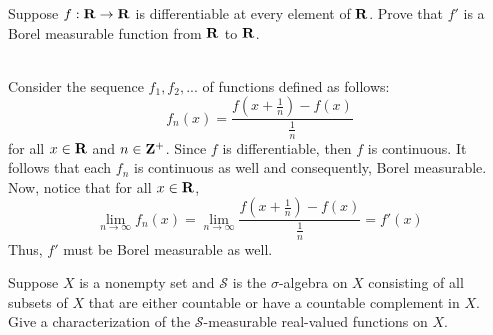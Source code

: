 \begin{exercise}
    Suppose $f : \mathbf{R} \to \mathbf{R}$ is differentiable at every element of $\mathbf{R}$. Prove that $f'$ is a Borel measurable function from $\mathbf{R}$ to $\mathbf{R}$. \\
\end{exercise}

\begin{solution}
    \\ Consider the sequence $f_1, f_2, ...$ of functions defined as follows:
    $$f_n(x) = \frac{f\left(x + \frac{1}{n}\right) - f(x)}{\frac{1}{n}} $$
    for all $x \in \mathbf{R}$ and $n \in \mathbf{Z}^+$. Since $f$ is differentiable, then $f$ is continuous. It follows that each $f_n$ is continuous as well and consequently, Borel measurable. Now, notice that for all $x \in \mathbf{R}$,
    $$\lim_{n \rightarrow \infty}f_n(x) = \lim_{n \rightarrow \infty} \frac{f\left(x + \frac{1}{n}\right) - f(x)}{\frac{1}{n}} = f'(x)$$
    Thus, $f'$ must be Borel measurable as well. \\
\end{solution}

\begin{exercise}
    Suppose $X$ is a nonempty set and $\mathcal{S}$ is the $\sigma$-algebra on $X$ consisting of all subsets of $X$ that are either countable or have a countable complement in $X$. Give a characterization of the $\mathcal{S}$-measurable real-valued functions on $X$.\\
\end{exercise}

